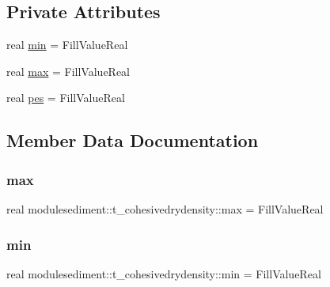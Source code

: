 \subsection*{Private Attributes}
\begin{DoxyCompactItemize}
\item 
real \mbox{\hyperlink{structmodulesediment_1_1t__cohesivedrydensity_a4369cb57edb7c0daddc4fb6d3cc42563}{min}} = Fill\+Value\+Real
\item 
real \mbox{\hyperlink{structmodulesediment_1_1t__cohesivedrydensity_a638edffeca106f4d73f91adf2234fcaa}{max}} = Fill\+Value\+Real
\item 
real \mbox{\hyperlink{structmodulesediment_1_1t__cohesivedrydensity_ad44fb1221a6767babe9ea42cf97069c3}{pes}} = Fill\+Value\+Real
\end{DoxyCompactItemize}


\subsection{Member Data Documentation}
\mbox{\label{structmodulesediment_1_1t__cohesivedrydensity_a638edffeca106f4d73f91adf2234fcaa}} 
\subsubsection{\texorpdfstring{max}{max}}
{\footnotesize\ttfamily real modulesediment\+::t\+\_\+cohesivedrydensity\+::max = Fill\+Value\+Real\hspace{0.3cm}{\ttfamily [private]}}

\mbox{\label{structmodulesediment_1_1t__cohesivedrydensity_a4369cb57edb7c0daddc4fb6d3cc42563}} 
\subsubsection{\texorpdfstring{min}{min}}
{\footnotesize\ttfamily real modulesediment\+::t\+\_\+cohesivedrydensity\+::min = Fill\+Value\+Real\hspace{0.3cm}{\ttfamily [private]}}

